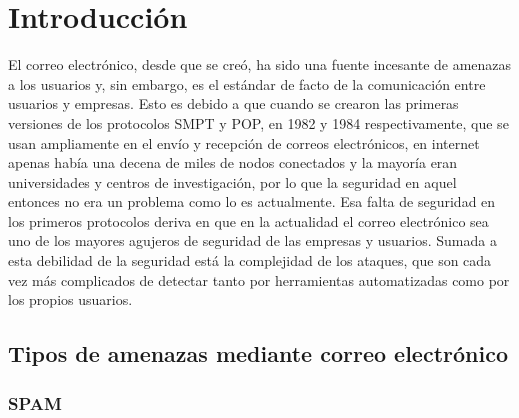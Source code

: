 \chapter{Introducción}
El correo electrónico, desde que se creó, ha sido una fuente incesante de amenazas a los usuarios y, sin embargo, es el estándar de facto de la comunicación entre usuarios y empresas. Esto es debido a que cuando se crearon las primeras versiones de los protocolos SMPT y POP, en 1982 \citep{rfc_smtp} y 1984 \citep{rfc_pop} respectivamente, que se usan ampliamente en el envío y recepción de correos electrónicos, en internet apenas había una decena de miles de nodos conectados y la mayoría eran universidades y centros de investigación, por lo que la seguridad en aquel entonces no era un problema como lo es actualmente. 
Esa falta de seguridad en los primeros protocolos deriva en que en la actualidad el correo electrónico sea uno de los mayores agujeros de seguridad de las empresas y usuarios. 
Sumada a esta debilidad de la seguridad está la complejidad de los ataques, que son cada vez más complicados de detectar tanto por herramientas automatizadas como por los propios usuarios. 
\section{Tipos de amenazas mediante correo electrónico}
\subsection{SPAM}